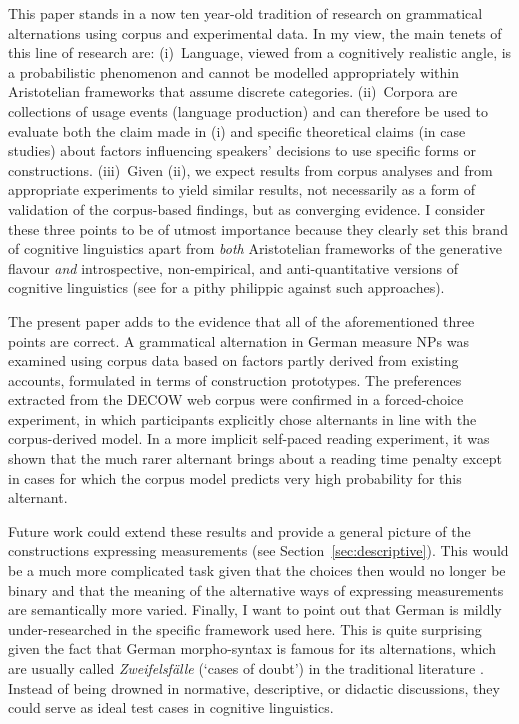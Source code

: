 \documentclass[USenglish]{article}
\begin{document}
This paper stands in a now ten year-old tradition of research on grammatical alternations using corpus and experimental data.
In my view, the main tenets of this line of research are:
(i)~Language, viewed from a cognitively realistic angle, is a probabilistic phenomenon and cannot be modelled appropriately within Aristotelian frameworks that assume discrete categories.
(ii)~Corpora are collections of usage events (language production) and can therefore be used to evaluate both the claim made in (i) and specific theoretical claims (in case studies) about factors influencing speakers' decisions to use specific forms or constructions.
(iii)~Given (ii), we expect results from corpus analyses and from appropriate experiments to yield similar results, not necessarily as a form of validation of the corpus-based findings, but as converging evidence.
I consider these three points to be of utmost importance because they clearly set this brand of cognitive linguistics apart from \textit{both} Aristotelian frameworks of the generative flavour \textit{and} introspective, non-empirical, and anti-quantitative versions of cognitive linguistics (see \citealp{Dabrowska2016} for a pithy philippic against such approaches).

The present paper adds to the evidence that all of the aforementioned three points are correct.
A grammatical alternation in German measure NPs was examined using corpus data based on factors partly derived from existing accounts, formulated in terms of construction prototypes.
The preferences extracted from the DECOW web corpus were confirmed in a forced-choice experiment, in which participants explicitly chose alternants in line with the corpus-derived model.
In a more implicit self-paced reading experiment, it was shown that the much rarer alternant brings about a reading time penalty except in cases for which the corpus model predicts very high probability for this alternant.

Future work could extend these results and provide a general picture of the constructions expressing measurements (see Section~\ref{sec:descriptive}).
This would be a much more complicated task given that the choices then would no longer be binary and that the meaning of the alternative ways of expressing measurements are semantically more varied.
Finally, I want to point out that German is mildly under-researched in the specific framework used here.
This is quite surprising given the fact that German morpho-syntax is famous for its alternations, which are usually called \textit{Zweifelsfälle} (`cases of doubt') in the traditional literature \citep{Duden09,Klein2009}.
Instead of being drowned in normative, descriptive, or didactic discussions, they could serve as ideal test cases in cognitive linguistics.
\end{document}
